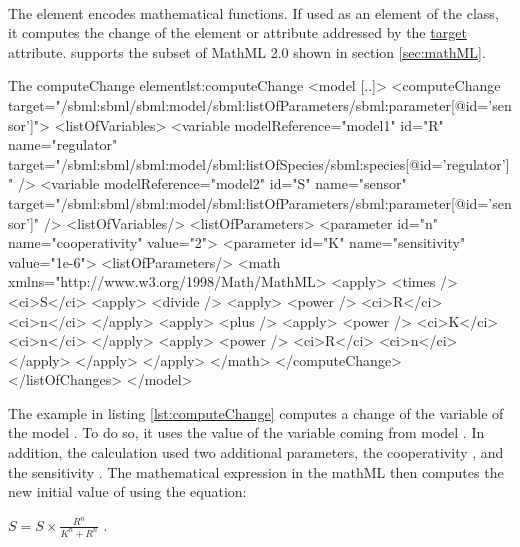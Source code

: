\paragraph{}
\label{sec:math}

The  element encodes mathematical functions. 
If used as an element of the  class, it computes the change of the element or attribute addressed by the \hyperref[sec:target]{target} attribute.
\LoneVtwo supports the subset of MathML 2.0 shown in section \ref{sec:mathML}.

%
\begin{myXmlLst}{The computeChange element}{lst:computeChange}
<model [..]>
    <computeChange target="/sbml:sbml/sbml:model/sbml:listOfParameters/sbml:parameter[@id='sensor']">
      <listOfVariables>
        <variable modelReference="model1" id="R" name="regulator" 
                  target="/sbml:sbml/sbml:model/sbml:listOfSpecies/sbml:species[@id='regulator']" />
        <variable modelReference="model2" id="S" name="sensor"
                  target="/sbml:sbml/sbml:model/sbml:listOfParameters/sbml:parameter[@id='sensor']" />
      <listOfVariables/>
      <listOfParameters>
        <parameter id="n" name="cooperativity" value="2">
        <parameter id="K" name="sensitivity" value="1e-6">
      <listOfParameters/>
      <math  xmlns="http://www.w3.org/1998/Math/MathML>
        <apply>
          <times />
          <ci>S</ci>
          <apply>
            <divide />
            <apply>
              <power />
              <ci>R</ci>
              <ci>n</ci>
            </apply>
            <apply>
              <plus />
              <apply>
                <power />
                <ci>K</ci>
                <ci>n</ci>
              </apply>
              <apply>
                <power />
                <ci>R</ci>
                <ci>n</ci>
              </apply>
            </apply> 
          </apply>
        </math>
    </computeChange>
  </listOfChanges>
</model>
\end{myXmlLst}
%

The example in listing \ref{lst:computeChange} computes a change of the variable  of the model . To do so, it uses the value of the variable  coming from model . In addition, the calculation used two additional parameters, the cooperativity , and the sensitivity .
The mathematical expression in the mathML then computes the new initial value of  using the equation:

\begin{math}
S =  S \times \frac{R^{n}}{K^{n}+R^{n}}
\end{math}
.


